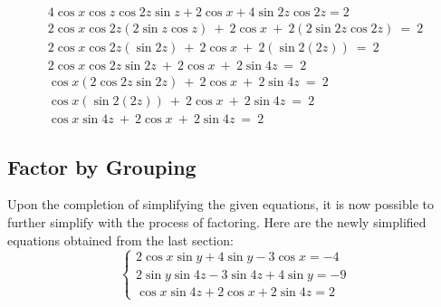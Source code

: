 \documentclass[a4paper,12pt]{article}
\begin{document}
\begin{equation}
    \begin{split}
        4\cos x\cos z\cos2z\sin z+2\cos x+4\sin2z\cos2z=2 \\
        2\cos x\cos2z\left(2\sin z\cos z\right)\ +\ 2\cos x\ +\ 2\left(2\sin2z\cos2z\right)\ =\ 2 \\
        2\cos x\cos2z\left(\sin2z\right)\ +\ 2\cos x\ +\ 2\left(\sin2\left(2z\right)\right)\ =\ 2 \\
        2\cos x\cos2z\sin2z\ +\ 2\cos x\ +\ 2\sin4z\ =\ 2 \\
        \cos x\left(2\cos2z\sin2z\right)\ +\ 2\cos x\ +\ 2\sin4z\ =\ 2 \\
        \cos x\left(\sin2\left(2z\right)\right)\ +\ 2\cos x\ +\ 2\sin4z\ =\ 2 \\
        \cos x\sin4z\ +\ 2\cos x\ +\ 2\sin4z\ =\ 2
    \end{split}
\end{equation}
\subsection*{Factor by Grouping}
Upon the completion of simplifying the given equations, it is now possible to further simplify with the process of factoring. \newline
Here are the newly simplified equations obtained from the last section:
$$
\begin{cases}
    2\cos x\sin y+ 4\sin y-3\cos x = -4\\
    2\sin y\sin 4z-3\sin 4z+4\sin y=-9 \\
    \cos x\sin 4z + 2\cos x + 2\sin 4z = 2
\end{cases}
$$
\end{document}
